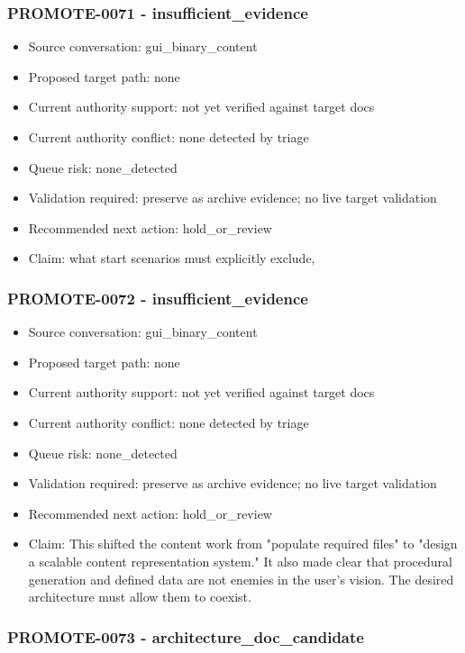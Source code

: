 \documentclass[11pt,a4paper]{report}
\begin{document}
\subsubsection{PROMOTE-0071 - insufficient\_evidence}

\begin{itemize}
\item Source conversation: gui\_binary\_content
\item Proposed target path: none
\item Current authority support: not yet verified against target docs
\item Current authority conflict: none detected by triage
\item Queue risk: none\_detected
\item Validation required: preserve as archive evidence; no live target validation
\item Recommended next action: hold\_or\_review
\item Claim: what start scenarios must explicitly exclude,
\end{itemize}

\subsubsection{PROMOTE-0072 - insufficient\_evidence}

\begin{itemize}
\item Source conversation: gui\_binary\_content
\item Proposed target path: none
\item Current authority support: not yet verified against target docs
\item Current authority conflict: none detected by triage
\item Queue risk: none\_detected
\item Validation required: preserve as archive evidence; no live target validation
\item Recommended next action: hold\_or\_review
\item Claim: This shifted the content work from "populate required files" to "design a scalable content representation system." It also made clear that procedural generation and defined data are not enemies in the user's vision. The desired architecture must allow them to coexist.
\end{itemize}

\subsubsection{PROMOTE-0073 - architecture\_doc\_candidate}
\end{document}
